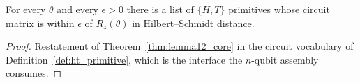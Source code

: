 \begin{theorem}[Lemma 12]
  \label{thm:lemma12}
  \leanok
  For every $\theta$ and every $\epsilon > 0$ there is a list of $\{H,T\}$
  primitives whose circuit matrix is within $\epsilon$ of $R_z(\theta)$ in
  Hilbert--Schmidt distance.
\end{theorem}

\begin{proof}
  \leanok
  Restatement of Theorem~\ref{thm:lemma12_core} in the circuit vocabulary of
  Definition~\ref{def:ht_primitive}, which is the interface the $n$-qubit
  assembly consumes.
\end{proof}

